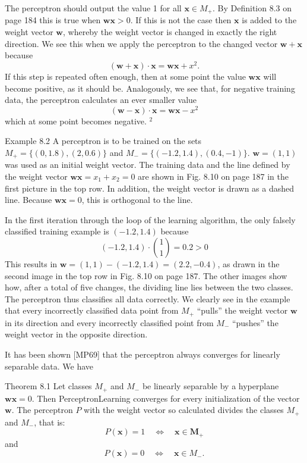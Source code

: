 \documentclass[10pt]{book}
\begin{document}
The perceptron should output the value 1 for all $\boldsymbol{x} \in M_{+}$. By Definition 8.3 on page 184 this is true when $\boldsymbol{w}\boldsymbol{x}>0$. If this is not the case then $\boldsymbol{x}$ is added to the weight vector $\boldsymbol{w}$, whereby the weight vector is changed in exactly the right direction. We see this when we apply the perceptron to the changed vector $\boldsymbol{w}+\boldsymbol{x}$ because
\[
(\boldsymbol{w}+\boldsymbol{x}) \cdot \boldsymbol{x}=\boldsymbol{w}\boldsymbol{x}+x^{2}.
\]
If this step is repeated often enough, then at some point the value $\boldsymbol{w}\boldsymbol{x}$ will become positive, as it should be. Analogously, we see that, for negative training data, the perceptron calculates an ever smaller value
\[
(\boldsymbol{w}-\boldsymbol{x}) \cdot \boldsymbol{x}=\boldsymbol{w}\boldsymbol{x}-x^{2}
\]
which at some point becomes negative. ${ }^{2}$

Example 8.2 A perceptron is to be trained on the sets $M_{+}=\{(0,1.8),(2,0.6)\}$ and $M_{-}=\{(-1.2,1.4),(0.4,-1)\}$. $\boldsymbol{w}=(1,1)$ was used as an initial weight vector. The training data and the line defined by the weight vector $\boldsymbol{w}\boldsymbol{x}=x_{1}+x_{2}=0$ are shown in Fig. 8.10 on page 187 in the first picture in the top row. In addition, the weight vector is drawn as a dashed line. Because $\boldsymbol{w}\boldsymbol{x}=0$, this is orthogonal to the line.

In the first iteration through the loop of the learning algorithm, the only falsely classified training example is $(-1.2,1.4)$ because
\[
(-1.2,1.4) \cdot\binom{1}{1}=0.2>0
\]
This results in $\boldsymbol{w}=(1,1)-(-1.2,1.4)=(2.2,-0.4)$, as drawn in the second image in the top row in Fig. 8.10 on page 187. The other images show how, after a total of five changes, the dividing line lies between the two classes. The perceptron thus classifies all data correctly. We clearly see in the example that every incorrectly classified data point from $M_{+}$ ``pulls'' the weight vector $\boldsymbol{w}$ in its direction and every incorrectly classified point from $M_{-}$ ``pushes'' the weight vector in the opposite direction.

It has been shown [MP69] that the perceptron always converges for linearly separable data. We have

Theorem 8.1 Let classes $M_{+}$ and $M_{-}$ be linearly separable by a hyperplane $\boldsymbol{w}\boldsymbol{x}=0$. Then PerceptronLearning converges for every initialization of the vector $\boldsymbol{w}$. The perceptron $P$ with the weight vector so calculated divides the classes $M_{+}$ and $M_{-}$, that is:
\[
P(\boldsymbol{x})=1 \quad \Leftrightarrow \quad \boldsymbol{x} \in \boldsymbol{M}_{+}
\]
and
\[
P(\boldsymbol{x})=0 \quad \Leftrightarrow \quad \boldsymbol{x} \in M_{-}.
\]
\end{document}
